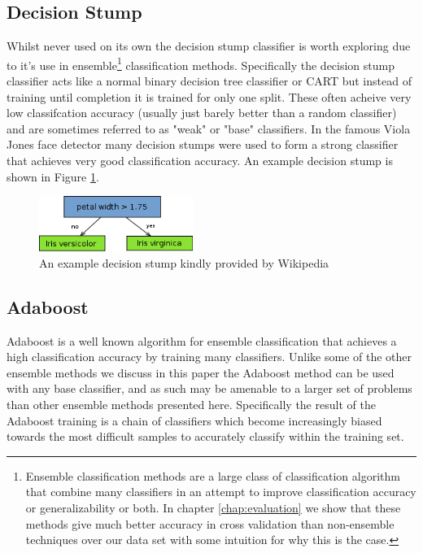 \documentclass[ %
                    author={Sam Phippen},
                supervisor={Dr. Rafal Bogacz},
                     title={Real time voice activity detectors in noisy personal computing environments},
                  subtitle={},
                    degree={MEng},
                      year={2012} ]{thesis}
\begin{document}
\subsection{Decision Stump}

Whilst never used on its own the decision stump classifier is worth exploring
due to it's use in ensemble\footnote{Ensemble classification methods are a
    large class of classification algorithm that combine many classifiers in an
    attempt to improve classification accuracy or generalizability or both. In
chapter \ref{chap:evaluation} we show that these methods give much better
accuracy in cross validation than non-ensemble techniques over our data set
with some intuition for why this is the case.} classification methods.
Specifically the decision stump classifier acts like a normal binary decision
tree classifier or CART but instead of training until completion it is trained
for only one split. These often acheive very low classifcation accuracy
(usually just barely better than a random classifier) and are sometimes
referred to as "weak" or "base" classifiers. In the famous Viola Jones face
detector\cite{viola} many decision stumps were used to form a strong classifier
that achieves very good classification accuracy. An example decision stump is
shown in Figure \ref{fig:decision-stump}.

\begin{figure}

    \includegraphics[width=5cm]{decision_stump.png}

    \label{fig:decision-stump}
    \caption{An example decision stump kindly provided by Wikipedia}
\end{figure}

\subsection{Adaboost}

Adaboost is a well known algorithm for ensemble classification that achieves
a high classification accuracy by training many classifiers. Unlike some of
the other ensemble methods we discuss in this paper the Adaboost method can
be used with any base classifier, and as such may be amenable to a larger set
of problems than other ensemble methods presented here. Specifically the result
of the Adaboost training is a chain of classifiers which become increasingly
biased towards the most difficult samples to accurately classify within the
training set.
\end{document}
